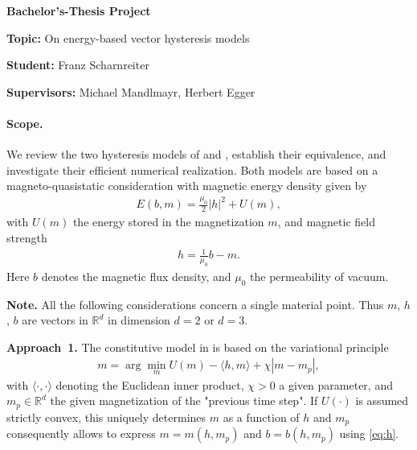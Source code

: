 \documentclass[12pt]{article}
\date{}
\def\RR{\mathbb{R}}
\begin{document}


\begin{center}
    \Large \textbf{Bachelor's-Thesis Project}
\end{center}

\bigskip 
\bigskip 
\bigskip 

\textbf{Topic:} 
On energy-based vector hysteresis models

\medskip 

\textbf{Student:} Franz Scharnreiter

\medskip 

\textbf{Supervisors:}
Michael Mandlmayr, Herbert Egger


\bigskip 

\paragraph{Scope.}

We review the two hysteresis models of \cite{Lavet} and \cite{Prigozhin}, establish their equivalence, and investigate their efficient numerical realization. 
%
Both models are based on a magneto-quasistatic consideration with magnetic energy density given by 
\begin{align} \label{eq:energy}
E(b,m) = \frac{\mu_0}{2} |h|^2 + U(m),
\end{align}
%
with $U(m)$ the energy stored in the magnetization $m$, and magnetic field strength
\begin{align} \label{eq:h}
    h = \frac{1}{\mu_0} b - m.
\end{align}
Here $b$ denotes the magnetic flux density, and $\mu_0$ the permeability of vacuum. 
%

\medskip 

\textbf{Note.}
All the following considerations concern a single material point.
%
Thus $m$, $h$, $b$ are vectors in $\RR^d$ in dimension $d=2$ or $d=3$.

\bigskip

\textbf{Approach~1.}
%
The constitutive model in \cite{Lavet} is based on the variational principle
\begin{align} \label{eq:lavet}
    m = \arg\min_m U(m) - \langle h,m\rangle + \chi |m - m_p|, 
\end{align}
with $\langle \cdot,\cdot\rangle$ denoting the Euclidean inner product, $\chi>0$ a given parameter, and $m_p \in \RR^d$ the given magnetization of the "previous time step".
%
If $U(\cdot)$ is assumed strictly convex, this uniquely determines $m$ as a function of $h$ and $m_p$ consequently allows to express $m=m(h,m_p)$ and $b=b(h,m_p)$ using \eqref{eq:h}. 
%
\end{document}
